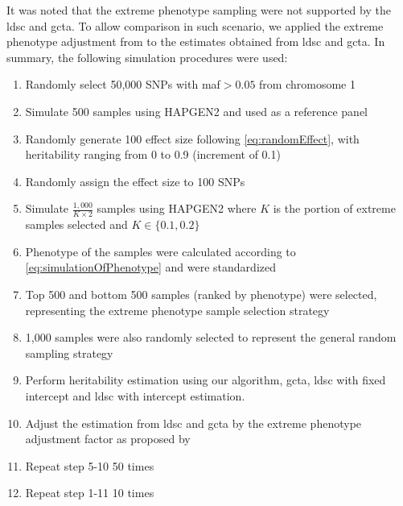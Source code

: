 \documentclass[12pt]{scrbook}
\begin{document}
It was noted that the extreme phenotype sampling were not supported by the \gls{ldsc} and \gls{gcta}.
To allow comparison in such scenario, we applied the extreme phenotype adjustment from \citet{Sham2014} to the estimates obtained from \gls{ldsc} and \gls{gcta}.
In summary, the following simulation procedures were used:
\begin{enumerate}
	\item Randomly select 50,000 \glspl{SNP} with \gls{maf}$>0.05$ from chromosome 1
	\item Simulate 500 samples using HAPGEN2 and used as a reference panel
	\item Randomly generate 100 effect size following \cref{eq:randomEffect}, with heritability ranging from 0 to 0.9 (increment of 0.1)
	\item Randomly assign the effect size to 100 \glspl{SNP}
	\item Simulate $\frac{1,000}{K\times2}$ samples using HAPGEN2 where $K$ is the portion of extreme samples selected and $K\in\{0.1,0.2\}$
	\item Phenotype of the samples were calculated according to \cref{eq:simulationOfPhenotype} and were standardized
	\item Top 500 and bottom 500 samples (ranked by phenotype) were selected, representing the extreme phenotype sample selection strategy
	\item 1,000 samples were also randomly selected to represent the general random sampling strategy
	\item Perform heritability estimation using our algorithm, \gls{gcta}, \gls{ldsc} with fixed intercept and \gls{ldsc} with intercept estimation.
	\item Adjust the estimation from \gls{ldsc} and \gls{gcta} by the extreme phenotype adjustment factor as proposed by \citet{Sham2014}
	\item Repeat step 5-10 50 times
	\item Repeat step 1-11 10 times
\end{enumerate}


\end{document}
